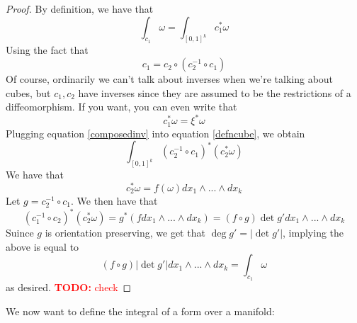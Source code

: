 \documentclass{article}
\newcommand{\TODO}[1]{\textcolor{red}{\textbf{TODO:} #1}}
\begin{document}
\begin{proof}
  By definition, we have that
  \begin{equation}
    \int_{c_1}\omega = \int_{[0, 1]^k}c_1^*\omega
    \label{defncube}
  \end{equation}
  Using the fact that
  \begin{equation}
    c_1 = c_2 \circ (c_2^{-1} \circ c_1)
    \label{composedinv}
  \end{equation}
  Of course, ordinarily we can't talk about inverses when we're talking about cubes, but \(c_1, c_2\) have inverses since they are assumed to be the restrictions of a diffeomorphism. If you want, you can even write that
  \begin{equation}
    c_1^*\omega = \xi^*\omega
  \end{equation}
  Plugging equation \ref{composedinv} into equation \ref{defncube}, we obtain
  \begin{equation}
    \int_{[0, 1]^k}(c_2^{-1} \circ c_1)^*(c_2^*\omega)
  \end{equation}
  We have that
  \begin{equation}
    c_2^*\omega = f(\omega)dx_1 \wedge ... \wedge dx_k
  \end{equation}
  Let \(g = c_2^{-1} \circ c_1\). We then have that
  \begin{equation}
    (c_1^{-1} \circ c_2)^*(c_2^*\omega) = g^*(f dx_1 \wedge ... \wedge dx_k) = (f \circ g)\det g'dx_1 \wedge ... \wedge dx_k
  \end{equation}
  Suince \(g\) is orientation preserving, we get that \(\deg g' = |\det g'|\), implying the above is equal to
  \begin{equation}
    (f \circ g)|\det g'|dx_1 \wedge ... \wedge dx_k = \int_{c_1}\omega
  \end{equation}
  as desired. \TODO{check}

\end{proof}
We now want to define the integral of a form over a manifold:
\end{document}
